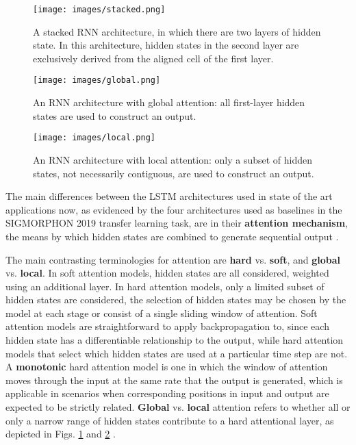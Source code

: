 \begin{figure}[ht]
\texttt{[image: images/stacked.png]}
\centering
\caption{A stacked RNN architecture, in which there are two layers of hidden state. In this architecture, hidden states in the second layer are exclusively derived from the aligned cell of the first layer. \parencite{Luong2015}}
\end{figure}

\begin{figure}[p]
\texttt{[image: images/global.png]}
\centering
\caption{An RNN architecture with global attention: all first-layer hidden states are used to construct an output. \parencite{Luong2015}}
\label{fig:global}
\end{figure}

\begin{figure}[p]
\texttt{[image: images/local.png]}
\centering
\caption{An RNN architecture with local attention: only a subset of hidden states, not necessarily contiguous, are used to construct an output. \parencite{Luong2015}}
\label{fig:local}
\end{figure}

The main differences between the LSTM architectures used in state of the art applications now, as evidenced by the four architectures used as baselines in the SIGMORPHON 2019 transfer learning task, are in their \textbf{attention mechanism}, the means by which hidden states are combined to generate sequential output \parencite{Cotterell2019}. 

The main contrasting terminologies for attention are \textbf{hard} vs. \textbf{soft}, and \textbf{global} vs. \textbf{local}. In soft attention models, hidden states are all considered, weighted using an additional layer. In hard attention models, only a limited subset of hidden states are considered, the selection of hidden states may be chosen by the model at each stage or consist of a single sliding window of attention. Soft attention models are straightforward to apply backpropagation to, since each hidden state has a differentiable relationship to the output, while hard attention models that select which hidden states are used at a particular time step are not. A \textbf{monotonic} hard attention model is one in which the window of attention moves through the input at the same rate that the output is generated, which is applicable in scenarios when corresponding positions in input and output are expected to be strictly related. \textbf{Global} vs. \textbf{local} attention refers to whether all or only a narrow range of hidden states contribute to a hard attentional layer, as depicted in Figs. \ref{fig:global} and \ref{fig:local} \parencite{Luong2015}. 

